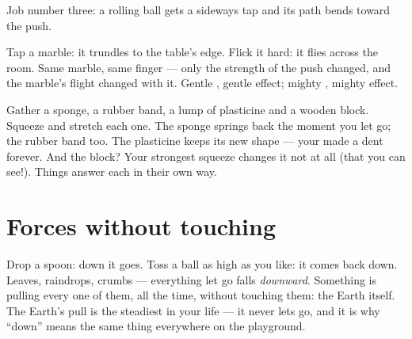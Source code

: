 \begin{omfigure}

{\small Job number three: a rolling ball gets a sideways tap and its
path bends toward the push.}
\end{omfigure}

\begin{example}\label{ex:g2:pushes-and-pulls:stronger}
Tap a marble: it trundles to the table's edge. Flick it hard: it
flies across the room. Same marble, same finger --- only the
strength of the push changed, and the marble's flight changed with
it. Gentle , gentle effect; mighty , mighty effect.
\end{example}

\begin{example}\label{ex:g2:pushes-and-pulls:shape}
Gather a sponge, a rubber band, a lump of plasticine and a wooden
block. Squeeze and stretch each one. The sponge springs back the
moment you let go; the rubber band too. The plasticine keeps its new
shape --- your  made a dent forever. And the block? Your
strongest squeeze changes it not at all (that you can see!). Things
answer  each in their own way.
\end{example}

\section{Forces without touching}

\begin{example}\label{ex:g2:pushes-and-pulls:earthpull}
Drop a spoon: down it goes. Toss a ball as high as you like: it
comes back down. Leaves, raindrops, crumbs --- everything let go
falls \emph{downward}. Something is pulling every one of them, all
the time, without touching them: the Earth itself. The Earth's pull
is the steadiest  in your life --- it never lets go, and it is
why ``down'' means the same thing everywhere on the playground.
\end{example}

